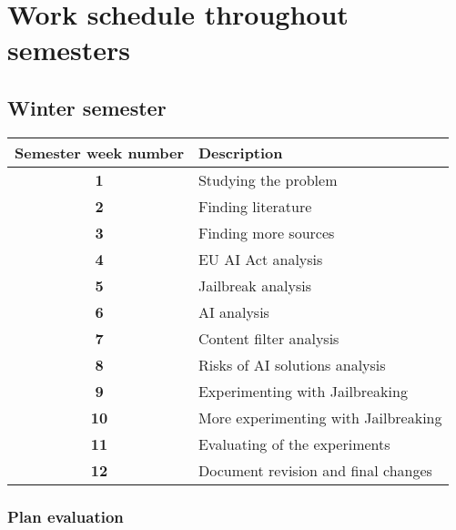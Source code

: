 \setcounter{figure}{0}
\setcounter{listing}{0}

\chapter{Work schedule throughout semesters \label{cha:work_schedule} }

\section*{Winter semester}

{
    \renewcommand{\arraystretch}{1.2}
    \begin{table}[htpb]
        \centering
        \begin{tabular}{|c|l|}
        \hline
        \cellcolor[gray]{0.8}\textbf{Semester week number} & \cellcolor[gray]{0.8}\textbf{Description} \\ \hline
    
        \textbf{1} & Studying the problem \\ \hline
        \textbf{2} & Finding literature \\ \hline
        \textbf{3} & Finding more sources \\ \hline
        \textbf{4} & EU AI Act analysis \\ \hline
        \textbf{5} & Jailbreak analysis \\ \hline
        \textbf{6} & AI analysis \\ \hline
        \textbf{7} & Content filter analysis \\ \hline
        \textbf{8} & Risks of AI solutions analysis \\ \hline
        \textbf{9} & Experimenting with Jailbreaking \\ \hline
        \textbf{10} & More experimenting with Jailbreaking \\ \hline
        \textbf{11} & Evaluating of the experiments \\ \hline
        \textbf{12} & Document revision and final changes \\ \hline
        \end{tabular}
    \end{table}
}

\subsection*{Plan evaluation}

